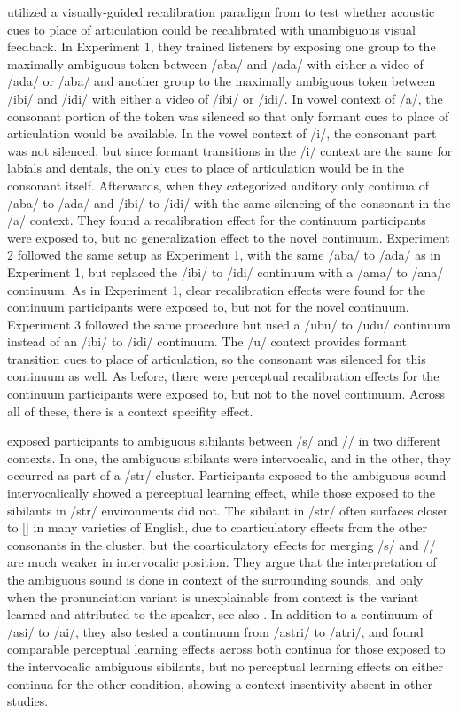 \citet{Reinisch2014} utilized a visually-guided recalibration paradigm from \citet{Bertelson2003} to test whether acoustic cues to place of articulation could be recalibrated with unambiguous visual feedback.  
In Experiment 1, they trained listeners by exposing one group to the maximally ambiguous token between /aba/ and /ada/ with either a video of /ada/ or /aba/ and another group to the maximally ambiguous token between /ibi/ and /idi/ with either a video of /ibi/ or /idi/.  
In vowel context of /a/, the consonant portion of the token was silenced so that only formant cues to place of articulation would be available.  
In the vowel context of /i/, the consonant part was not silenced, but since formant transitions in the /i/ context are the same for labials and dentals, the only cues to place of articulation would be in the consonant itself.  
Afterwards, when they categorized auditory only continua of /aba/ to /ada/ and /ibi/ to /idi/ with the same silencing of the consonant in the /a/ context.  They found a recalibration effect for the continuum participants were exposed to, but no generalization effect to the novel continuum.  
Experiment 2 followed the same setup as Experiment 1, with the same /aba/ to /ada/ as in Experiment 1, but replaced the /ibi/ to /idi/ continuum with a /ama/ to /ana/ continuum.  
As in Experiment 1, clear recalibration effects were found for the continuum participants were exposed to, but not for the novel continuum.  
Experiment 3 followed the same procedure but used a /ubu/ to /udu/ continuum instead of an /ibi/ to /idi/ continuum.  
The /u/ context provides formant transition cues to place of articulation, so the consonant was silenced for this continuum as well.  
As before, there were perceptual recalibration effects for the continuum participants were exposed to, but not to the novel continuum.  
Across all of these, there is a context specifity effect. 

\citet{Kraljic2008a} exposed participants to ambiguous sibilants between /s/ and /\textesh/ in two different contexts.  
In one, the ambiguous sibilants were intervocalic, and in the other, they occurred as part of a /str/ cluster.  
Participants exposed to the ambiguous sound intervocalically showed a perceptual learning effect, while those exposed to the sibilants in /str/ environments did not.  
The sibilant in /str/ often surfaces closer to [\textesh] in many varieties of English, due to coarticulatory effects from the other consonants in the cluster, but the coarticulatory effects for merging /s/ and /\textesh/ are much weaker in intervocalic position.  
They argue that the interpretation of the ambiguous sound is done in context of the surrounding sounds, and only when the pronunciation variant is unexplainable from context is the variant learned and attributed to the speaker, see also \citet{Kraljic2008}.  
In addition to a continuum of /asi/ to /a\textesh i/, they also tested a continuum from /astri/ to /a\textesh tri/, and found comparable perceptual learning effects across both continua for those exposed to the intervocalic ambiguous sibilants, but no perceptual learning effects on either continua for the other condition, showing a context insentivity absent in other studies.

